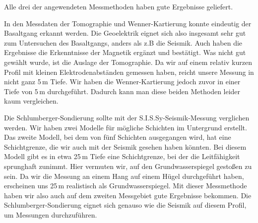 Alle drei der angewendeten Messmethoden haben gute Ergebnisse geliefert.

In den Messdaten der Tomographie und Wenner-Kartierung konnte eindeutig der Basaltgang erkannt werden. Die Geoelektrik eignet sich also insgesamt sehr gut zum Untersuchen des Basaltgangs,
anders als z.B die Seismik. Auch haben die Ergebnisse die Erkenntnisse der Magnetik ergänzt und bestätigt.
Was nicht gut gewählt wurde, ist die Auslage der Tomographie. Da wir auf einem relativ kurzen Profil mit kleinen Elektrodenabständen gemessen haben, reicht unsere Messung in nicht ganz 5\,m 
Tiefe. Wir haben die Wenner-Kartierung jedoch zuvor in einer Tiefe von 5\,m durchgeführt. Dadurch kann man diese beiden Methoden leider kaum vergleichen.

Die Schlumberger-Sondierung sollte mit der S.I.S.Sy-Seismik-Messung verglichen werden. Wir haben zwei Modelle für mögliche Schichten im Untergrund erstellt. Das zweite Modell,
bei dem von fünf Schichten ausgegangen wird,
hat eine Schichtgrenze, die wir auch mit der Seismik gesehen haben könnten. Bei diesem Modell gibt es in etwa 25\,m Tiefe eine Schichtgrenze, bei der die Leitfähigkeit sprunghaft zunimmt.
Hier vermuten wir, auf den Grundwasserspiegel gestoßen zu sein.
Da wir die Messung an einem Hang auf einem Hügel durchgeführt haben, erscheinen uns 25\,m realistisch als Grundwasserspiegel. 
Mit dieser Messmethode haben wir also auch auf dem zweiten Messgebiet gute Ergebnisse bekommen. 
Die Schlumberger-Sondierung eignet sich genauso wie die Seismik auf diesem Profil, um Messungen durchzuführen. 